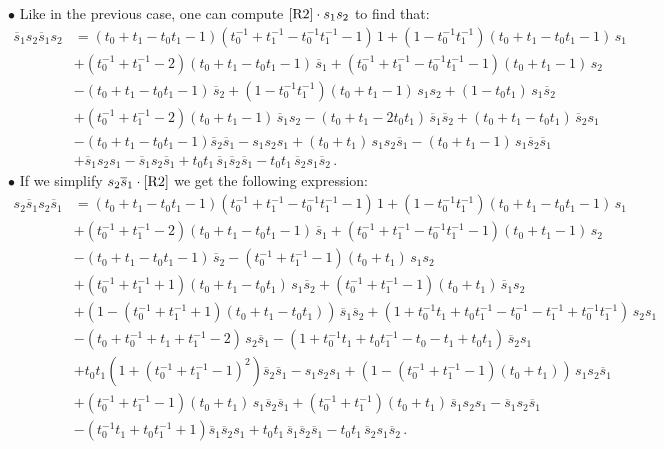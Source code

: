 \documentclass[12pt,reqno]{amsart}
\theoremstyle{definition}
\def\hs{\overline{s}}
\begin{document}
$\bullet$ \ovalbox{Case of $\hs_1 s_2 \hs_1 s_2$.} Like in the previous case,
one can compute $\eqref{R2} \cdot s_1 s_2$ to find that:
\begin{align*}
  \hs_1 s_2 \hs_1 s_2& = (t_0 + t_1 - t_0 t_1 - 1) (t_0^{-1} + t_1^{-1}
  - t_0^{-1} t_1^{-1} -1) \, 1 + (1 - t_0^{-1} t_1^{-1})
  (t_0 + t_1 -t_0 t_1 - 1) \, s_1\\
  & + (t_0^{-1} + t_1^{-1} -2) (t_0 + t_1 - t_0 t_1 -1) \, \hs_1
  + (t_0^{-1} + t_1^{-1} - t_0^{-1} t_1^{-1} -1) (t_0 + t_1 -1) \, s_2 \\
  & - (t_0 + t_1 - t_0 t_1 -1) \, \hs_2 + (1 - t_0^{-1} t_1^{-1} )
  (t_0 + t_1 -1) \, s_1 s_2 + (1 - t_0 t_1) \, s_1 \hs_2 \\
  & + (t_0^{-1} + t_1^{-1} -2) (t_0 + t_1 -1) \, \hs_1 s_2
  - (t_0+t_1-2t_0 t_1) \, \hs_1 \hs_2 + (t_0 + t_1 - t_0 t_1) \, \hs_2 s_1 \\
  & - (t_0 + t_1 - t_0 t_1 -1) \hs_2 \hs_1 - s_1 s_2 s_1
  + (t_0 + t_1) \,  s_1 s_2 \hs_1  - (t_0 + t_1 -1) \,  s_1 \hs_2 \hs_1 \\
  & + \hs_1 s_2 s_1 - \hs_1 s_2 \hs_1 + t_0 t_1  \, \hs_1 \hs_2 \hs_1
  - t_0 t_1  \, \hs_2 s_1 \hs_2 \,.
\end{align*}
$\bullet$ \ovalbox{Case of $s_2 \hs_1 s_2 \hs_1$.} If we simplify
$s_2 \hs_1 \cdot \eqref{R2}$ we get the following expression:
\begin{align*}
  s_2 \hs_1 s_2 \hs_1& =  (t_0 + t_1 - t_0 t_1 - 1) (t_0^{-1} + t_1^{-1}
  - t_0^{-1} t_1^{-1} -1) \, 1 + (1 - t_0^{-1} t_1^{-1})
  (t_0 + t_1 -t_0 t_1 - 1) \, s_1\\
  & + (t_0^{-1} + t_1^{-1} -2) (t_0 + t_1 - t_0 t_1 -1) \, \hs_1
  + (t_0^{-1} + t_1^{-1} - t_0^{-1} t_1^{-1} -1) (t_0 + t_1 -1) \, s_2 \\
  & - (t_0 + t_1 - t_0 t_1 -1) \, \hs_2 - (t_0^{-1} + t_1^{-1}-1)
  (t_0 + t_1) \, s_1 s_2 \\
  & + (t_0^{-1} + t_1^{-1} + 1) (t_0 + t_1 -t_0 t_1) \, s_1 \hs_2
  + (t_0^{-1} + t_1^{-1} -1) (t_0 + t_1) \, \hs_1 s_2\\
  & + (1 - (t_0^{-1} + t_1^{-1} +1) (t_0 + t_1 - t_0 t_1)) \, \hs_1 \hs_2
  + (1 + t_0^{-1} t_1 + t_0 t_1^{-1} - t_0^{-1} - t_1^{-1}
+ t_0^{-1} t_1^{-1}) \, s_2 s_1 \\
& - (t_0 + t_0^{-1} + t_1 + t_1^{-1} -2) \, s_2 \hs_1
- (1 + t_0^{-1} t_1 + t_0 t_1^{-1} - t_0 - t_1 + t_0 t_1) \, \hs_2 s_1\\
& + t_0 t_1 (1 + (t_0^{-1} + t_1^{-1} -1)^2) \hs_2 \hs_1 - s_1 s_2 s_1
+ (1 - (t_0^{-1} + t_1^{-1} -1) (t_0 + t_1)) \,  s_1 s_2 \hs_1 \\
& + (t_0^{-1} + t_1^{-1} -1) (t_0 + t_1) \,  s_1 \hs_2 \hs_1
+ (t_0^{-1} + t_1^{-1}) (t_0 + t_1) \, \hs_1 s_2 s_1 - \hs_1 s_2 \hs_1\\
& - (t_0^{-1} t_1 + t_0 t_1^{-1} +1) \hs_1 \hs_2 s_1 + t_0 t_1  \,
\hs_1 \hs_2 \hs_1 - t_0 t_1  \, \hs_2 s_1 \hs_2  \,.
\end{align*}
\end{document}
